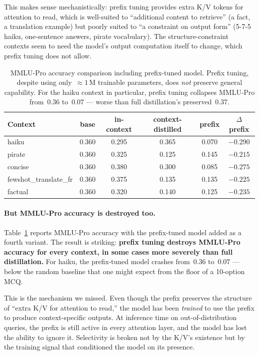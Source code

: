 \documentclass{article}
\begin{document}
This makes sense mechanistically: prefix tuning provides extra K/V
tokens for attention to read, which is well-suited to ``additional
content to retrieve'' (a fact, a translation example) but poorly suited
to ``a constraint on output form'' (5-7-5 haiku, one-sentence answers,
pirate vocabulary). The structure-constraint contexts seem to need
the model's output computation itself to change, which prefix tuning
does not allow.

\begin{table}[t]
\centering
\caption{MMLU-Pro accuracy comparison including prefix-tuned model.
Prefix tuning, despite using only~$\approx 1$\,M trainable parameters,
does \emph{not} preserve general capability. For the haiku context in
particular, prefix tuning collapses MMLU-Pro from~$0.36$ to~$0.07$ ---
worse than full distillation's preserved~$0.37$.}
\label{tab:mmlu_prefix}
\small
\begin{tabular}{lccccc}
\toprule
Context & base & in-context & context-distilled & prefix & $\Delta$prefix \\
\midrule
haiku                  & 0.360 & 0.295 & 0.365 & 0.070 & $\mathbf{-0.290}$ \\
pirate                 & 0.360 & 0.325 & 0.125 & 0.145 & $-0.215$ \\
concise                & 0.360 & 0.380 & 0.300 & 0.085 & $\mathbf{-0.275}$ \\
fewshot\_translate\_fr & 0.360 & 0.375 & 0.135 & 0.135 & $-0.225$ \\
factual                & 0.360 & 0.320 & 0.140 & 0.125 & $-0.235$ \\
\bottomrule
\end{tabular}
\end{table}

\paragraph{But MMLU-Pro accuracy is destroyed too.}
Table~\ref{tab:mmlu_prefix} reports MMLU-Pro accuracy with the
prefix-tuned model added as a fourth variant. The result is striking:
\textbf{prefix tuning destroys MMLU-Pro accuracy for every context, in
some cases more severely than full distillation.} For haiku, the
prefix-tuned model crashes from~$0.36$ to~$0.07$ --- below the random
baseline that one might expect from the floor of a 10-option MCQ.

This is the mechanism we missed. Even though the prefix preserves the
structure of ``extra K/V for attention to read,'' the model has been
\emph{trained} to use the prefix to produce context-specific outputs.
At inference time on out-of-distribution queries, the prefix is still
active in every attention layer, and the model has lost the ability to
ignore it. Selectivity is broken not by the K/V's existence but by the
training signal that conditioned the model on its presence.
\end{document}

